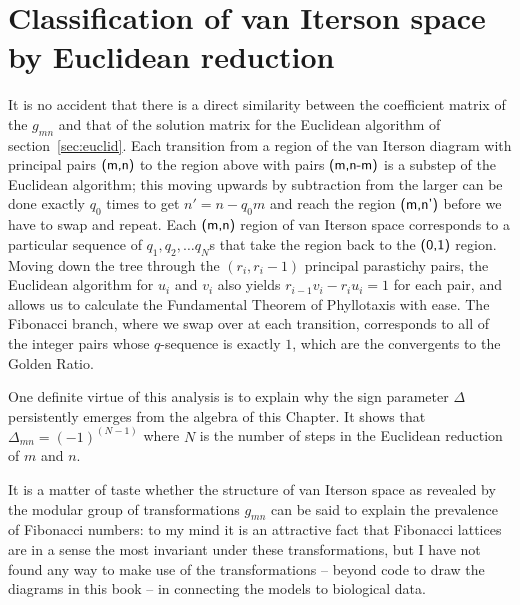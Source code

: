 \section{Classification of van Iterson space by Euclidean reduction}
It is no accident that there is a direct similarity between the coefficient matrix of the $g_{mn}$ and that of the solution matrix for the Euclidean algorithm of section~\ref{sec:euclid}.
Each transition from a region of the van Iterson diagram with principal pairs $\textsf{(m,n)}$ to the region above with pairs $\textsf{(m,n-m)}$ is a substep of the Euclidean algorithm; this moving upwards by subtraction from the larger can be done exactly $q_0$ times to get $n'=n-q_0 m$ and reach the region $\textsf{(m,n')}$ before we have to swap and repeat. 
Each $\textsf{(m,n)}$ region of van Iterson space corresponds to a particular sequence of  $q_1, q_2, \ldots q_N$s that take the region back to the $\textsf{(0,1)}$ region.     Moving down the tree through the $(r_i,r_i-1)$ principal parastichy pairs, the Euclidean algorithm for $u_i$ and $v_i$ also yields  $r_{i-1} v_i- r_i u_i=1$ for each pair, and allows us to calculate the Fundamental Theorem of Phyllotaxis with ease. The Fibonacci branch, where we swap over at each transition, corresponds to all of the integer pairs whose $q$-sequence is exactly $1$, which are the convergents to the Golden Ratio. 

One definite virtue of this analysis is to explain why the sign parameter $\Delta$ persistently emerges from the algebra of this Chapter. It shows that $\Delta_{mn}=(-1)^{(N-1)}$ where $N$ is the number of steps in the Euclidean reduction of $m$ and $n$. 


It is a matter of taste whether the structure of van Iterson space as revealed by the modular group of transformations $g_{mn}$ can be said to explain the prevalence of Fibonacci numbers: to my mind it is an attractive fact that Fibonacci lattices are in a sense the most invariant under these transformations, but I have not found any way to make use of the transformations -- beyond  code to draw the diagrams in this book -- in connecting the models to biological data. 



